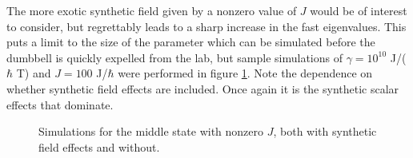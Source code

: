 \documentclass[main.tex]{subfiles}
\begin{document}
The more exotic synthetic field given by a nonzero value of \(J\) would be of interest to
consider, but regrettably leads to a sharp increase in the fast eigenvalues. This puts a
limit to the size of the parameter which can be simulated before the dumbbell is quickly
expelled from the lab, but sample simulations of \(\gamma = 10^{10}\) J/(\(\hbar{}\) T) and \(J = 100\) J/\(\hbar{}\) were performed
in figure \ref{fig:n1Je2}. Note the dependence on whether synthetic field effects are
included. Once again it is the synthetic scalar effects that dominate.
\begin{figure}[h]
    \centering
    \qquad
    \caption{\centering Simulations for the middle state with nonzero \(J\), both with synthetic field
    effects and without.}%
    \label{fig:n1Je2}
\end{figure}
\end{document}
